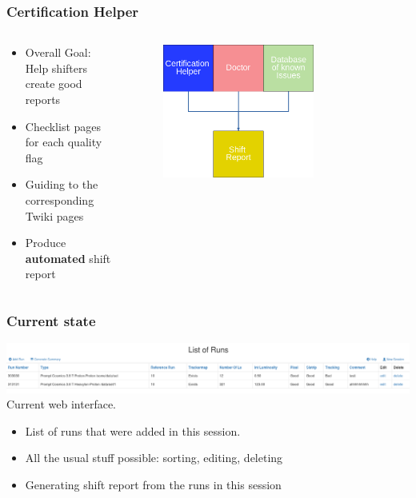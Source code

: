 \documentclass{beamer}
\begin{document}
\begin{frame}
\frametitle{Certification Helper}
  \begin{columns}[T]
   \begin{column}{.5\textwidth}
   \begin{block}{}

\begin{itemize}
 \item Overall Goal: Help shifters create good reports
 \item Checklist pages for each quality flag
 \item Guiding to the corresponding Twiki pages
 \item Produce \textbf{automated} shift report
\end{itemize}
   	\end{block}	
    \end{column}
    \begin{column}{.5\textwidth}
    \begin{block}{}
        \begin{figure}[h]
        \phantom{g}
		\includegraphics[width=0.7\textwidth]{figures/overview_1.png}
		\end{figure}
    \end{block}
    \end{column}
  \end{columns}
\end{frame}

\begin{frame}
  \frametitle{Current state}
\includegraphics[width=\textwidth]{figures/list.png}\\
Current web interface.\\
\begin{itemize}
\item List of runs that were added in this session.
\item All the usual stuff possible: sorting, editing, deleting
\item Generating shift report from the runs in this session
\end{itemize}
\end{frame}
\end{document}
